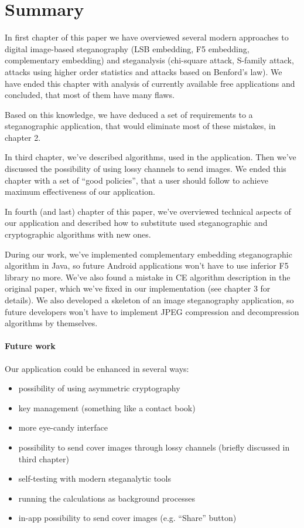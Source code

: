 \chapter*{Summary}

In first chapter of this paper we have overviewed several
modern approaches to digital image-based steganography (LSB embedding, F5 embedding, complementary embedding)
and steganalysis (chi-square attack, S-family attack, attacks using higher order statistics
and attacks based on Benford's law). We have  ended this chapter with analysis of currently available
free applications and concluded, that most of them have many flaws.

Based on this knowledge, we have deduced a set of requirements to a steganographic application, 
that would eliminate most of these mistakes, in chapter 2.

In third chapter, we've described algorithms, used in the application. Then we've discussed
the possibility of using lossy channels to send images. We ended this chapter with a set of
``good policies'', that a user should follow to achieve maximum effectiveness of our application.

In fourth (and last) chapter of this paper, we've overviewed technical aspects of our application and 
described how to substitute used steganographic and cryptographic algorithms with new ones.

During our work, we've implemented complementary embedding steganographic algorithm in Java,
so future Android applications won't have to use inferior F5 library no more. We've also found a mistake in CE algorithm
description in the original paper, which we've fixed in our implementation (see chapter 3 for details).
We also developed a skeleton of an image steganography application, so future developers won't have to
implement JPEG compression and decompression algorithms by themselves.

\subsubsection{Future work}
Our application could be enhanced in several ways:
\begin{itemize}
  \item possibility of using asymmetric cryptography
  \item key management (something like a contact book)
  \item more eye-candy interface
  \item possibility to send cover images through lossy channels (briefly discussed in third chapter)
  \item self-testing with modern steganalytic tools
  \item running the calculations as background processes
  \item in-app possibility to send cover images (e.g. ``Share'' button)
\end{itemize}
